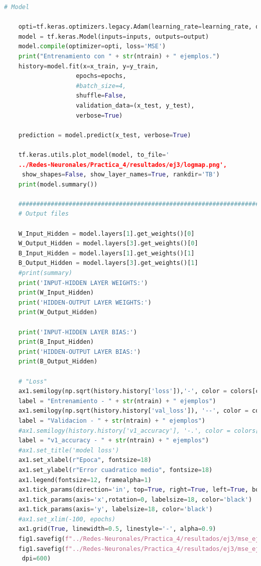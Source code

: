 \documentclass[11pt,twocolumn,twoside]{opticajnl}
\begin{document}
\begin{onecolumn}
\begin{lstlisting}[language=Python, caption={Ejercicio 3}, label=ej3]
    # Model 
    
    opti=tf.keras.optimizers.legacy.Adam(learning_rate=learning_rate, decay=0.0)
    model = tf.keras.Model(inputs=inputs, outputs=output)
    model.compile(optimizer=opti, loss='MSE')
    print("Entrenamiento con " + str(ntrain) + " ejemplos.")
    history=model.fit(x=x_train, y=y_train,
                    epochs=epochs,
                    #batch_size=4,
                    shuffle=False,
                    validation_data=(x_test, y_test), 
                    verbose=True)
    
    prediction = model.predict(x_test, verbose=True)
    
    tf.keras.utils.plot_model(model, to_file='
    ../Redes-Neuronales/Practica_4/resultados/ej3/logmap.png',
     show_shapes=False, show_layer_names=True, rankdir='TB')
    print(model.summary())

    #####################################################################
    # Output files

    W_Input_Hidden = model.layers[1].get_weights()[0]
    W_Output_Hidden = model.layers[3].get_weights()[0]
    B_Input_Hidden = model.layers[1].get_weights()[1]
    B_Output_Hidden = model.layers[3].get_weights()[1]
    #print(summary)
    print('INPUT-HIDDEN LAYER WEIGHTS:')
    print(W_Input_Hidden)
    print('HIDDEN-OUTPUT LAYER WEIGHTS:')
    print(W_Output_Hidden)

    print('INPUT-HIDDEN LAYER BIAS:')
    print(B_Input_Hidden)
    print('HIDDEN-OUTPUT LAYER BIAS:')
    print(B_Output_Hidden)

    # "Loss"
    ax1.semilogy(np.sqrt(history.history['loss']),'-', color = colors[c],  
    label = "Entrenamiento - " + str(ntrain) + " ejemplos")
    ax1.semilogy(np.sqrt(history.history['val_loss']), '--', color = colors[c], 
    label = "Validacion - " + str(ntrain) + " ejemplos")
    #ax1.semilogy(history.history['v1_accuracy'], '-.', color = colors[c], 
    label = "v1_accuracy - " + str(ntrain) + " ejemplos")
    #ax1.set_title('model loss')
    ax1.set_xlabel(r"Epoca", fontsize=18)
    ax1.set_ylabel(r"Error cuadratico medio", fontsize=18)
    ax1.legend(fontsize=12, framealpha=1)
    ax1.tick_params(direction='in', top=True, right=True, left=True, bottom=True)
    ax1.tick_params(axis='x',rotation=0, labelsize=18, color='black')
    ax1.tick_params(axis='y', labelsize=18, color='black')
    #ax1.set_xlim(-100, epochs)
    ax1.grid(True, linewidth=0.5, linestyle='-', alpha=0.9)
    fig1.savefig(f"../Redes-Neuronales/Practica_4/resultados/ej3/mse_ej3.pdf")
    fig1.savefig(f"../Redes-Neuronales/Practica_4/resultados/ej3/mse_ej3.png",
     dpi=600)


\end{lstlisting}
\end{onecolumn}
\end{document}
